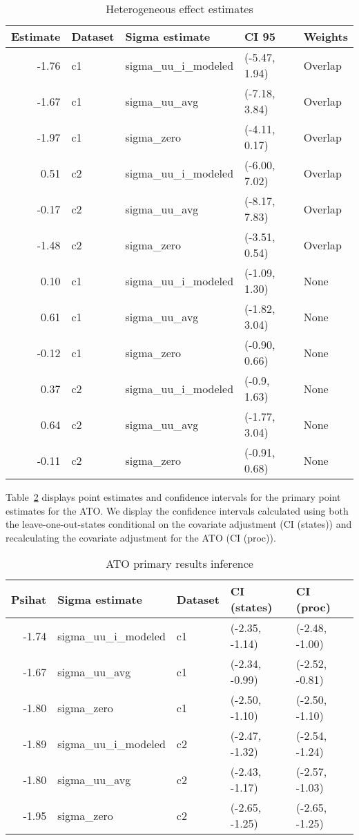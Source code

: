 \begin{table}[ht]
\caption{Heterogeneous effect estimates}
\label{tab:hte}
\centering
\begin{tabular}{rllll}
  \hline
Estimate & Dataset & Sigma estimate & CI 95 & Weights \\ 
  \hline
  -1.76 & c1 & sigma\_uu\_i\_modeled & (-5.47, 1.94) & Overlap \\ 
  -1.67 & c1 & sigma\_uu\_avg & (-7.18, 3.84) & Overlap \\ 
  -1.97 & c1 & sigma\_zero & (-4.11, 0.17) & Overlap \\ 
  0.51 & c2 & sigma\_uu\_i\_modeled & (-6.00, 7.02) & Overlap \\ 
  -0.17 & c2 & sigma\_uu\_avg & (-8.17, 7.83) & Overlap \\ 
  -1.48 & c2 & sigma\_zero & (-3.51, 0.54) & Overlap \\ 
  0.10 & c1 & sigma\_uu\_i\_modeled & (-1.09, 1.30) & None \\ 
  0.61 & c1 & sigma\_uu\_avg & (-1.82, 3.04) & None \\ 
  -0.12 & c1 & sigma\_zero & (-0.90, 0.66) & None \\ 
  0.37 & c2 & sigma\_uu\_i\_modeled & (-0.9, 1.63) & None \\ 
  0.64 & c2 & sigma\_uu\_avg & (-1.77, 3.04) & None \\ 
  -0.11 & c2 & sigma\_zero & (-0.91, 0.68) & None \\ 
   \hline
\end{tabular}
\end{table}

Table~\ref{tab:ATOconfint} displays point estimates and confidence intervals for the primary point estimates for the ATO. We display the confidence intervals calculated using both the leave-one-out-states conditional on the covariate adjustment (CI (states)) and recalculating the covariate adjustment for the ATO (CI (proc)). 

\begin{table}[ht]
\centering
\caption{ATO primary results inference}
\label{tab:ATOconfint}
\begin{tabular}{rllll}
  \hline
Psihat & Sigma estimate & Dataset & CI (states) & CI (proc) \\ 
  \hline
-1.74 & sigma\_uu\_i\_modeled & c1 & (-2.35, -1.14) & (-2.48, -1.00) \\ 
  -1.67 & sigma\_uu\_avg & c1 & (-2.34, -0.99) & (-2.52, -0.81) \\ 
  -1.80 & sigma\_zero & c1 & (-2.50, -1.10) & (-2.50, -1.10) \\ 
  -1.89 & sigma\_uu\_i\_modeled & c2 & (-2.47, -1.32) & (-2.54, -1.24) \\ 
  -1.80 & sigma\_uu\_avg & c2 & (-2.43, -1.17) & (-2.57, -1.03) \\ 
  -1.95 & sigma\_zero & c2 & (-2.65, -1.25) & (-2.65, -1.25) \\ 
   \hline
\end{tabular}
\end{table}

